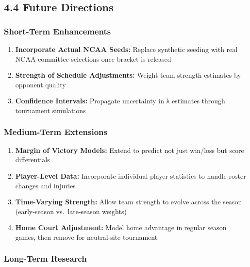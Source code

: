 \documentclass[
]{article}
\begin{document}
\subsection{4.4 Future Directions}\label{future-directions}

\subsubsection{Short-Term Enhancements}\label{short-term-enhancements}

\begin{enumerate}
\def\labelenumi{\arabic{enumi}.}
\item
  \textbf{Incorporate Actual NCAA Seeds:} Replace synthetic seeding with
  real NCAA committee selections once bracket is released
\item
  \textbf{Strength of Schedule Adjustments:} Weight team strength
  estimates by opponent quality
\item
  \textbf{Confidence Intervals:} Propagate uncertainty in λ estimates
  through tournament simulations
\end{enumerate}

\subsubsection{Medium-Term Extensions}\label{medium-term-extensions}

\begin{enumerate}
\def\labelenumi{\arabic{enumi}.}
\item
  \textbf{Margin of Victory Models:} Extend to predict not just win/loss
  but score differentials
\item
  \textbf{Player-Level Data:} Incorporate individual player statistics
  to handle roster changes and injuries
\item
  \textbf{Time-Varying Strength:} Allow team strength to evolve across
  the season (early-season vs.~late-season weights)
\item
  \textbf{Home Court Adjustment:} Model home advantage in regular season
  games, then remove for neutral-site tournament
\end{enumerate}

\subsubsection{Long-Term Research}\label{long-term-research}
\end{document}
